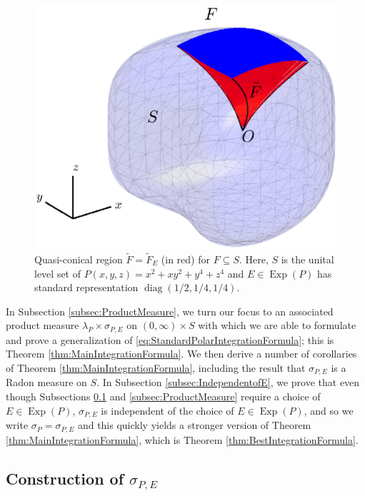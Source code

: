\documentclass[11pt, letter]{book}
\newcommand\Exp{\operatorname{Exp}}
\newcommand\diag{\operatorname{diag}}
\begin{document}
\begin{figure}[!htb]
    \centering
    \includegraphics[scale=0.7, trim={1cm 3cm 1cm 2cm},clip]{Fig4.eps}
    \caption{Quasi-conical region $\widetilde{F}=\widetilde{F}_E$ (in red) for $F\subseteq S$. Here, $S$ is the unital level set of $P(x,y,z) = x^2 + xy^2 + y^4 + z^4$ and $E\in\Exp(P)$ has standard representation $\diag(1/2,1/4,1/4)$. }
    \label{fig:level_set_F_3D}
\end{figure}


In Subsection \ref{subsec:ProductMeasure}, we turn our focus to an associated product measure $\lambda_P\times\sigma_{P,E}$ on $(0,\infty)\times S$ with which we are able to formulate and prove a generalization of \eqref{eq:StandardPolarIntegrationFormula}; this is Theorem \ref{thm:MainIntegrationFormula}. We then derive a number of corollaries of Theorem \ref{thm:MainIntegrationFormula}, including the result that $\sigma_{P,E}$ is a Radon measure on $S$. In Subsection \ref{subsec:IndependentofE}, we prove that even though Subsections \ref{subsec:ConstructionofSigma} and \ref{subsec:ProductMeasure} require a choice of $E\in \Exp(P)$, $\sigma_{P,E}$ is independent of the choice of $E\in \Exp(P)$, and so we write $\sigma_P=\sigma_{P,E}$ and this quickly yields a stronger version of Theorem \ref{thm:MainIntegrationFormula}, which is Theorem \ref{thm:BestIntegrationFormula}.  






\subsection{Construction of $\sigma_{P,E}$}\label{subsec:ConstructionofSigma}
\end{document}
